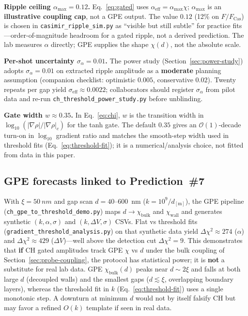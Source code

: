 \documentclass[11pt,a4paper]{article}
\begin{document}
\textbf{Ripple ceiling $\alpha_{\max} = 0.12$.}
Eq.~\ref{eq:gated} uses $\alpha_{\mathrm{eff}} = \alpha_{\max}\chi$; $\alpha_{\max}$ is an \textbf{illustrative coupling cap}, not a GPE output.
The value $0.12$ (12\% on $F/F_{\mathrm{Cas}}$) is chosen in \texttt{casimir\_ripple\_sim.py} as ``visible but still subtle'' for practice fits---order-of-magnitude headroom for a gated ripple, not a derived prediction.
The lab measures $\alpha$ directly; GPE supplies the shape $\chi(d)$, not the absolute scale.

\textbf{Per-shot uncertainty $\sigma_\alpha = 0.01$.}
The power study (Section~\ref{sec:power-study}) adopts $\sigma_\alpha = 0.01$ on extracted ripple amplitude as a \textbf{moderate} planning assumption (companion checklist: optimistic $0.005$, conservative $0.02$).
Twenty repeats per gap yield $\sigma_{\mathrm{eff}} \approx 0.0022$; collaborators should register $\sigma_\alpha$ from pilot data and re-run \texttt{ch\_threshold\_power\_study.py} before unblinding.

\textbf{Gate width $w \approx 0.35$.}
In Eq.~\ref{eq:chi}, $w$ is the transition width in $\log_{10}(|\nabla\rho|/|\nabla\rho|_c)$ for the tanh gate.
The default $0.35$ gives an $\mathcal{O}(1)$-decade turn-on in $\log_{10}$ gradient ratio and matches the smooth-step width used in threshold fits (Eq.~\ref{eq:threshold-fit}); it is a numerical/analysis choice, not fitted from data in this paper.

\subsection{GPE forecasts linked to Prediction~\#7}
\label{sec:gpe-p7-forecasts}

With $\xi = \SI{50}{nm}$ and gap scan $d = 40$--$600$~nm ($k = 10^9/d_{[\mathrm{m}]}$), the GPE pipeline (\texttt{ch\_gpe\_to\_threshold\_demo.py}) maps $d \to \chi_{\mathrm{bulk}}$ and $\chi_{\mathrm{wall}}$ and generates synthetic $(k, \alpha, \sigma)$ and $(k, \Delta V, \sigma)$ CSVs.
Flat vs threshold fits (\texttt{gradient\_threshold\_analysis.py}) on that synthetic data yield $\Delta\chi^2 \approx 274$ ($\alpha$) and $\Delta\chi^2 \approx 429$ ($\Delta V$)---well above the detection cut $\Delta\chi^2 = 9$.
This demonstrates that \textbf{if} CH gated amplitudes track GPE $\chi$ vs $d$ under the bulk coupling of Section~\ref{sec:probe-coupling}, the protocol has statistical power; it is \textbf{not} a substitute for real lab data.
GPE $\chi_{\mathrm{bulk}}(d)$ peaks near $d \sim 2\xi$ and falls at both large $d$ (decoupled walls) and the smallest gaps ($d \lesssim \xi$, overlapping boundary layers), whereas the threshold fit in $k$ (Eq.~\ref{eq:threshold-fit}) uses a single monotonic step.
A downturn at minimum $d$ would not by itself falsify CH but may favor a refined $O(k)$ template if seen in real data.
\end{document}
